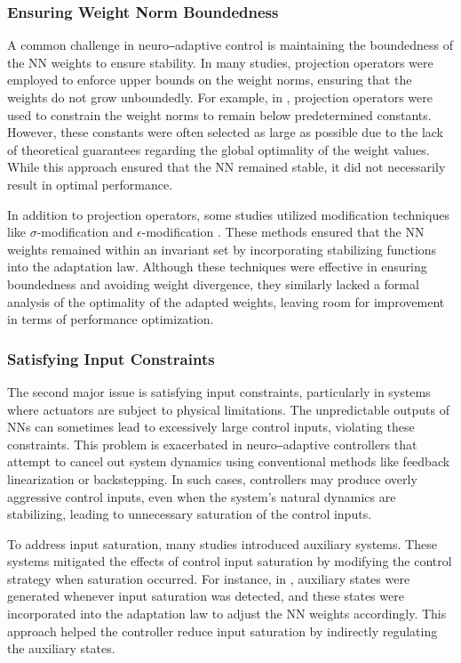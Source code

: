 \documentclass[lettersize,journal]{IEEEtran}
\begin{document}
\subsubsection{Ensuring Weight Norm Boundedness}

A common challenge in neuro‒adaptive control is maintaining the boundedness of the NN weights to ensure stability. In many studies, projection operators were employed to enforce upper bounds on the weight norms, ensuring that the weights do not grow unboundedly. For example, in \cite{RN16, RN14, RN11}, projection operators were used to constrain the weight norms to remain below predetermined constants. However, these constants were often selected as large as possible due to the lack of theoretical guarantees regarding the global optimality of the weight values. While this approach ensured that the NN remained stable, it did not necessarily result in optimal performance.

In addition to projection operators, some studies utilized modification techniques like $\sigma$-modification \cite{RN10} and $\epsilon$-modification \cite{RN41, RN3}. These methods ensured that the NN weights remained within an invariant set by incorporating stabilizing functions into the adaptation law. Although these techniques were effective in ensuring boundedness and avoiding weight divergence, they similarly lacked a formal analysis of the optimality of the adapted weights, leaving room for improvement in terms of performance optimization.

\subsubsection{Satisfying Input Constraints}

The second major issue is satisfying input constraints, particularly in systems where actuators are subject to physical limitations. The unpredictable outputs of NNs can sometimes lead to excessively large control inputs, violating these constraints. This problem is exacerbated in neuro‒adaptive controllers that attempt to cancel out system dynamics using conventional methods like feedback linearization or backstepping. In such cases, controllers may produce overly aggressive control inputs, even when the system's natural dynamics are stabilizing, leading to unnecessary saturation of the control inputs.

To address input saturation, many studies introduced auxiliary systems. These systems mitigated the effects of control input saturation by modifying the control strategy when saturation occurred. For instance, in \cite{RN55, RN56, RN3}, auxiliary states were generated whenever input saturation was detected, and these states were incorporated into the adaptation law to adjust the NN weights accordingly. This approach helped the controller reduce input saturation by indirectly regulating the auxiliary states.
\end{document}
